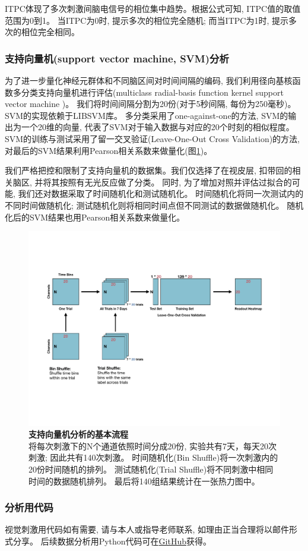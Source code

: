 ITPC体现了多次刺激间脑电信号的相位集中趋势。根据公式可知, ITPC值的取值范围为0到1。
当ITPC为0时, 提示多次的相位完全随机; 而当ITPC为1时, 提示多次的相位完全相同。

\subsubsection{支持向量机(support vector machine, SVM)分析}
为了进一步量化神经元群体和不同脑区间对时间间隔的编码,
我们利用径向基核函数多分类支持向量机进行评估(multiclass radial-basis function kernel support vector machine )。
我们将时间间隔分割为20份(对于5秒间隔, 每份为250毫秒)。
SVM的实现依赖于LIBSVM库\cite{chang2011libsvm}。
多分类采用了one-against-one的方法, SVM的输出为一个20维的向量, 代表了SVM对于输入数据与对应的20个时刻的相似程度。
SVM的训练与测试采用了留一交叉验证(Leave-One-Out Cross Validation)的方法, 对最后的SVM结果利用Pearson相关系数来做量化(图\ref{fig:svm_scheme})。

我们严格把控和限制了支持向量机的数据集。我们仅选择了在视皮层, 扣带回的相关脑区, 并将其按照有无光反应做了分类。
同时, 为了增加对照并评估过拟合的可能, 我们还对数据采取了时间随机化和测试随机化。
时间随机化将同一次测试内的不同时间做随机化;
测试随机化则将相同时间点但不同测试的数据做随机化。
随机化后的SVM结果也用Pearson相关系数来做量化。

\begin{figure}[h]
    \centering
    \includegraphics[width=\textwidth]{src/figures/svm_workflow.pdf}
    \caption{\textbf{支持向量机分析的基本流程}\\
        将每次刺激下的N个通道依照时间分成{\color{red}20}份,
        实验共有7天，每天{\color{blue}20}次刺激; 因此共有140次刺激。
        时间随机化(Bin Shuffle)将一次刺激内的20份时间随机的排列。
        测试随机化(Trial Shuffle)将不同刺激中相同时间的数据随机排列。
        最后将140组结果统计在一张热力图中。}
    \label{fig:svm_scheme}
\end{figure}

\subsubsection{分析用代码}
视觉刺激用代码如有需要, 请与本人或指导老师联系, 如理由正当合理将以邮件形式分享。
后续数据分析用Python代码可在\href{https://github.com/ZhangJiayiLab/EEGAnalysis/releases/tag/v1.0}{GitHub}获得。
